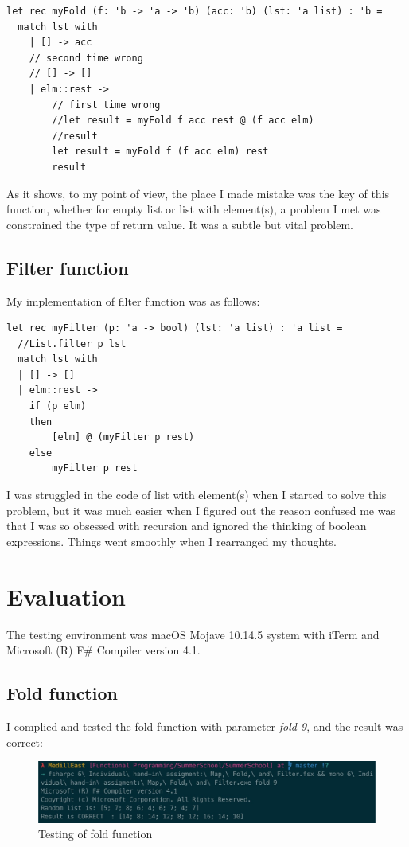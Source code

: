 \documentclass[sigconf]{acmart}
\begin{document}
\begin{lstlisting}
let rec myFold (f: 'b -> 'a -> 'b) (acc: 'b) (lst: 'a list) : 'b =
  match lst with
    | [] -> acc
    // second time wrong
    // [] -> []
    | elm::rest -> 
        // first time wrong
        //let result = myFold f acc rest @ (f acc elm)
        //result
        let result = myFold f (f acc elm) rest
        result
\end{lstlisting}

As it shows, to my point of view, the place I made mistake was the key of this function, whether for empty list or list with element(s), a problem I met was constrained the type of return value. It was a subtle but vital problem.

\subsection{Filter function}

My implementation of filter function was as follows:


\lstset{language=Csh}
\begin{lstlisting}
let rec myFilter (p: 'a -> bool) (lst: 'a list) : 'a list =
  //List.filter p lst
  match lst with
  | [] -> []
  | elm::rest -> 
    if (p elm)
    then 
        [elm] @ (myFilter p rest)
    else 
        myFilter p rest
\end{lstlisting}

I was struggled in the code of list with element(s) when I started to solve this problem, but it was much easier when I figured out the reason confused me was that I was so obsessed with recursion and ignored the thinking of boolean expressions. Things went smoothly when I rearranged my thoughts.

\section{Evaluation}

The testing environment was macOS Mojave 10.14.5 system with iTerm and Microsoft (R) F\# Compiler version 4.1.

\subsection{Fold function}

I complied and tested the fold function with parameter \emph{fold 9}, and the result was correct:

\begin{figure}[h]
      \centering
      \includegraphics[width=\linewidth]{aaafiles/fold}
      \caption{Testing of fold function}
      \label{fig:fold}
\end{figure}
\end{document}
